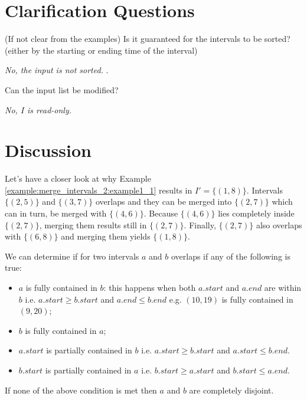 \section{Clarification Questions}

\begin{QandA}
	\begin{questionitem} \begin{question} (If not clear from the examples) Is it guaranteed for the intervals to be sorted? (either by the starting or ending time of the interval) \end{question} 	 
    \begin{answered}
		\textit{No, the input is not sorted. }.
	\end{answered} \end{questionitem}

	\begin{questionitem} \begin{question} Can the input list be modified?\end{question} 	 
    \begin{answered}
		\textit{No, $I$ is read-only.}
	\end{answered} \end{questionitem}
\end{QandA}


\section{Discussion}
\label{example:merge_intervals_2:discussion_1}
Let's have a closer look at why Example \ref{example:merge_intervals_2:example1_1} results in $I'=\{(1,8)\}$. Intervals $\{(2,5)\}$ and $\{(3,7)\}$ overlaps and they can be merged into $\{(2,7)\}$ which can in turn, be merged with $\{(4,6)\}$. Because $\{(4,6)\}$ lies completely inside $\{(2,7)\}$, merging them results still in $\{(2,7)\}$. Finally, $\{(2,7)\}$ also overlaps with $\{(6,8)\}$ and merging them yields $\{(1,8)\}$.

We can determine if for two intervals $a$ and $b$ overlaps if any of the following is true:
\begin{itemize}
	\item $a$ is fully contained in $b$: this happens when both $a.start$ and $a.end$ are within $b$ i.e. $a.start \geq b.start$ and   $a.end \leq b.end$ e.g. $(10,19)$ is fully contained in $(9,20)$;
	\item $b$ is fully contained in $a$;
	\item $a.start$ is partially contained in $b$ i.e. $a.start \geq b.start $ and $a.start \leq b.end$.
	\item $b.start$ is partially contained in $a$ i.e. $b.start \geq a.start $ and $b.start \leq a.end$.
\end{itemize}
If none of the above condition is met then $a$ and $b$ are completely disjoint.

